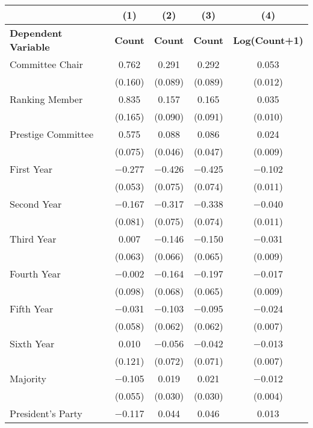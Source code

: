 \begin{tabular}[t]{lcccc}
\toprule
  & (1) & (2) & (3) & (4)\\
\midrule
\textbf{Dependent Variable} & \textbf{Count} & \textbf{Count} & \textbf{Count} & \textbf{Log(Count+1)}\\
\midrule
Committee Chair & \num{0.762} & \num{0.291} & \num{0.292} & \num{0.053}\\
 & (\num{0.160}) & (\num{0.089}) & (\num{0.089}) & (\num{0.012})\\
Ranking Member & \num{0.835} & \num{0.157} & \num{0.165} & \num{0.035}\\
 & (\num{0.165}) & (\num{0.090}) & (\num{0.091}) & (\num{0.010})\\
Prestige Committee & \num{0.575} & \num{0.088} & \num{0.086} & \num{0.024}\\
 & (\num{0.075}) & (\num{0.046}) & (\num{0.047}) & (\num{0.009})\\
First Year & \num{-0.277} & \num{-0.426} & \num{-0.425} & \num{-0.102}\\
 & (\num{0.053}) & (\num{0.075}) & (\num{0.074}) & (\num{0.011})\\
Second Year & \num{-0.167} & \num{-0.317} & \num{-0.338} & \num{-0.040}\\
 & (\num{0.081}) & (\num{0.075}) & (\num{0.074}) & (\num{0.011})\\
Third Year & \num{0.007} & \num{-0.146} & \num{-0.150} & \num{-0.031}\\
 & (\num{0.063}) & (\num{0.066}) & (\num{0.065}) & (\num{0.009})\\
Fourth Year & \num{-0.002} & \num{-0.164} & \num{-0.197} & \num{-0.017}\\
 & (\num{0.098}) & (\num{0.068}) & (\num{0.065}) & (\num{0.009})\\
Fifth Year & \num{-0.031} & \num{-0.103} & \num{-0.095} & \num{-0.024}\\
 & (\num{0.058}) & (\num{0.062}) & (\num{0.062}) & (\num{0.007})\\
Sixth Year & \num{0.010} & \num{-0.056} & \num{-0.042} & \num{-0.013}\\
 & (\num{0.121}) & (\num{0.072}) & (\num{0.071}) & (\num{0.007})\\
Majority & \num{-0.105} & \num{0.019} & \num{0.021} & \num{-0.012}\\
 & (\num{0.055}) & (\num{0.030}) & (\num{0.030}) & (\num{0.004})\\
President's Party & \num{-0.117} & \num{0.044} & \num{0.046} & \num{0.013}\\

\end{tabular}
